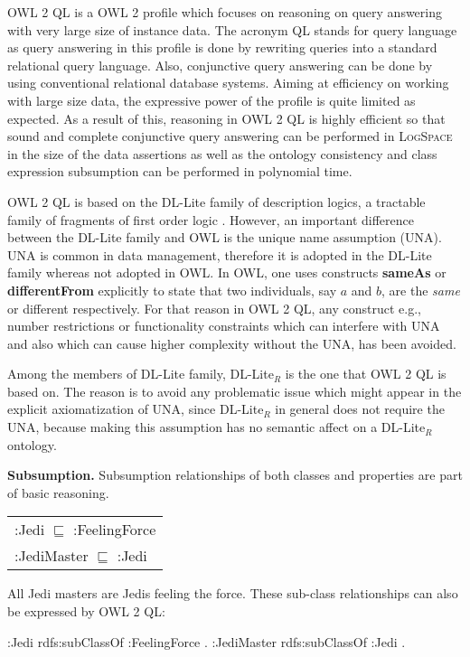 \documentclass{llncs}
\newenvironment{DL}{
  \scriptsize
  \sffamily
  \vspace{0.3cm}
  \begin{tabular}{l}

}{
  \end{tabular}
  \linebreak
}
\begin{document}
OWL 2 QL is a OWL 2 profile which focuses on reasoning on query answering with very large size of instance data. The acronym QL stands for query language as query answering in this profile is done by rewriting queries into a standard relational query language. Also,  conjunctive query answering can be done by using conventional relational database systems. Aiming at efficiency on working with large size data, the expressive power of the profile is quite limited as expected. As a result of this, reasoning in OWL 2 QL is highly efficient so that sound and complete conjunctive query answering can be performed in \textsc{LogSpace} in the size of the data assertions as well as  the ontology consistency and class expression subsumption can be performed in polynomial time.

OWL 2 QL is based on the DL-Lite family of description logics, a tractable family of fragments of first order logic \cite{Artale2009,Calvanese2007}. 
However, an important difference between the DL-Lite family and OWL is the
unique name assumption (UNA). UNA is common in data management, therefore it is adopted in the DL-Lite family whereas not adopted in OWL. In OWL, one uses constructs \textbf{sameAs} or \textbf{differentFrom} explicitly to state that two individuals, say  $a$ and $b$, are the \emph{same} or {different} respectively. For that reason in OWL 2 QL, any construct e.g., number restrictions or functionality constraints which can interfere with UNA and also which can cause higher complexity without the UNA, has been avoided.


Among the members of DL-Lite family, DL-Lite$_R$ is the one that OWL 2 QL is based on. The reason is to avoid any problematic issue which might appear in the explicit axiomatization of UNA, since  DL-Lite$_R$ in general does not require the UNA, because making this assumption has no semantic affect on a DL-Lite$_R$ ontology. 

\textbf{Subsumption.}
Subsumption relationships of both classes and properties are part of basic reasoning.

\begin{DL}
:Jedi $\sqsubseteq$ :FeelingForce \\
:JediMaster $\sqsubseteq$ :Jedi \\
\end{DL}

All Jedi masters are Jedis feeling the force.
These sub-class relationships can also be expressed by OWL 2 QL:

\begin{ex}
:Jedi rdfs:subClassOf :FeelingForce . 
:JediMaster rdfs:subClassOf :Jedi . 
\end{ex}
\end{document}

